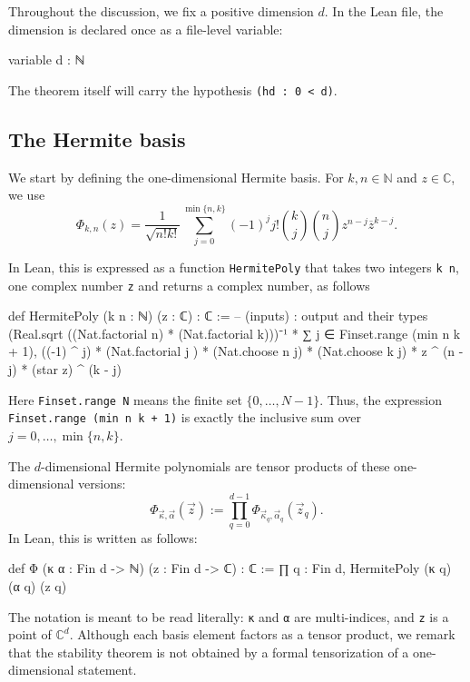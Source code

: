 \documentclass[11pt]{amsart}
\newcommand{\inlean}[1]{{\scriptsize \texttt{#1}}}
\theoremstyle{remark}
\newcommand{\C}{\mathbb{C}}
\begin{document}
Throughout the discussion, we fix a positive dimension $d$.  In the Lean file,
the dimension is declared once as a file-level variable:
\begin{leancode}
variable {d : ℕ}
\end{leancode}
The theorem itself will carry the hypothesis {\inlean{(hd : 0 < d)}}. 



\subsection{The Hermite basis}

We start by defining the one-dimensional Hermite basis. For $k,n \in \mathbb N$ and
$z\in \mathbb C$, we use
\begin{equation*}
    \Phi_{k,n}(z) = \frac{1}{\sqrt{n!k!}}
    \sum_{j=0}^{\min\{n,k\}}(-1)^j j!
    \binom{k}{j}\binom{n}{j} z^{n-j}\overline{z}^{k-j}.
\end{equation*}


In Lean, this is expressed as a function \inlean{HermitePoly} that takes two integers \inlean{k n}, one complex number \inlean{z} and returns a complex number, as follows
\begin{leancode}
def HermitePoly (k n : ℕ) (z : ℂ) : ℂ := -- (inputs) : output and their types
  (Real.sqrt ((Nat.factorial n) * (Nat.factorial k)))⁻¹ *
    ∑ j ∈ Finset.range (min n k + 1),
      ((-1) ^ j) * (Nat.factorial j ) *
        (Nat.choose n j) * (Nat.choose k j) *
        z ^ (n - j) * (star z) ^ (k - j)
\end{leancode}
Here {\inlean{Finset.range N}} means the finite set $\{0,\ldots,N-1\}$.  Thus,
the expression {\inlean{Finset.range (min n k + 1)}}  is exactly the inclusive sum over $j=0,\ldots,\min\{n,k\}$.
\medskip

The $d$-dimensional Hermite polynomials are tensor products of these
one-dimensional versions:
\[
\Phi_{\vec\kappa,\vec\alpha}(\vec z)
:=\prod_{q=0}^{d-1}\Phi_{\vec\kappa_q,\vec\alpha_q}(\vec z_q).
\]
In Lean, this is written as follows:
\begin{leancode}
def Φ (κ α : Fin d -> ℕ) (z : Fin d -> ℂ) : ℂ :=
  ∏ q : Fin d, HermitePoly (κ q) (α q) (z q)
\end{leancode}
The notation is meant to be read literally: {\inlean{κ}} and {\inlean{α}} are
multi-indices, and {\inlean{z}} is a point of $\C^d$.  Although each basis
element factors as a tensor product, we remark that the stability theorem is not obtained by
a formal tensorization of a one-dimensional statement.%
\end{document}
